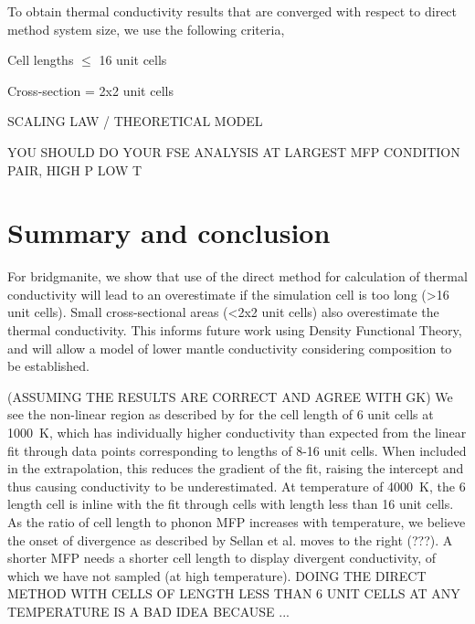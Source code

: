 \documentclass[%
preprint,                                  %
nofootinbib,
 amsmath,amssymb,
 aps,
]{revtex4-1}
\begin{document}
To obtain thermal conductivity results that are converged with respect to direct method system size, we use the following criteria,

Cell lengths $\leq$ 16 unit cells

Cross-section = 2x2 unit cells

SCALING LAW / THEORETICAL MODEL

YOU SHOULD DO YOUR FSE ANALYSIS AT LARGEST MFP CONDITION PAIR, HIGH P LOW T


















\section{\label{sec:summary}Summary and conclusion}

For bridgmanite, we show that use of the direct method for calculation of thermal conductivity will lead to an overestimate if the simulation cell is too long (\textgreater 16 unit cells). Small cross-sectional areas (\textless 2x2 unit cells) also overestimate the thermal conductivity. This informs future work using Density Functional Theory, and will allow a model of lower mantle conductivity considering composition to be established.



(ASSUMING THE RESULTS ARE CORRECT AND AGREE WITH GK) We see the non-linear region as described by \citet{Sellan2010} for the cell length of 6 unit cells at 1000~K, which has individually higher conductivity than expected from the linear fit through data points corresponding to lengths of 8-16 unit cells. When included in the extrapolation, this reduces the gradient of the fit, raising the intercept and thus causing conductivity to be underestimated. At temperature of 4000~K, the 6 length cell is inline with the fit through cells with length less than 16 unit cells. As the ratio of cell length to phonon MFP increases with temperature, we believe the onset of divergence as described by Sellan et al. moves to the right (???). A shorter MFP needs a shorter cell length to display divergent conductivity, of which we have not sampled (at high temperature). DOING THE DIRECT METHOD WITH CELLS OF LENGTH LESS THAN 6 UNIT CELLS AT ANY TEMPERATURE IS A BAD IDEA BECAUSE ... 
\end{document}
